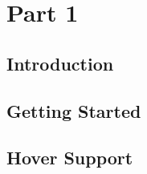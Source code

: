 \usepackage{lipsum}
\usepackage{soul}





\coverpage{\TITLE}{\SUBTITLE}{\AUTHOR}{\DATE}{\SUBJECT}
\newpage
\backgroundbarvisiblefalse
\pagestyle{plain}




\newpage
\tableofcontents

\part{Part 1}
\newpage
\chapter{Introduction} \label{ch:introduction}

\newpage
\chapter{Getting Started} \label{ch:getting_started}

\newpage
\chapter{Hover Support} \label{ch:hover_support}


